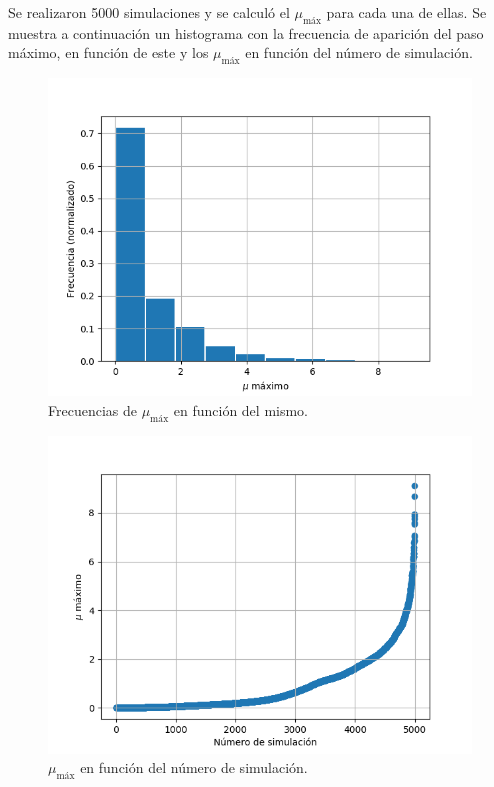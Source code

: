 \documentclass[main.tex]{subfiles}
\begin{document}
Se realizaron 5000 simulaciones y se calculó el $\mu_\text{máx}$ para cada una de ellas.
Se muestra a continuación un histograma con la frecuencia de aparición del paso máximo, 
en función de este y los $\mu_\text{máx}$ en función del número de simulación.
\begin{figure}[H]
    \centering
    \includegraphics[scale=0.5]{imagenes/lms_mus_hist.png}
    \caption{Frecuencias de $\mu_\text{máx}$ en función del mismo.}
\end{figure}
\begin{figure}[H]
    \centering
    \includegraphics[scale=0.5]{imagenes/lms_mus_scatter.png}
    \caption{$\mu_\text{máx}$ en función del número de simulación.}
\end{figure}
\end{document}
